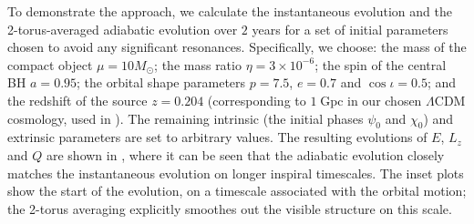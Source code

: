 
To demonstrate the approach, we calculate the instantaneous evolution and the 2-torus-averaged adiabatic evolution over $2$ years for a set of initial parameters chosen to avoid any significant resonances. Specifically, we choose: the mass of the compact object $\mu = 10 M_{\odot}$; the mass ratio $\eta = 3\times 10^{-6}$; the spin of the central BH $a=0.95$; the orbital shape parameters $p=7.5$, $e=0.7$ and $\cos \iota = 0.5$; and the redshift of the source $z=0.204$ (corresponding to $1\;\mathrm{Gpc}$ in our chosen $\Lambda$CDM cosmology, used in ). The remaining intrinsic (the initial phases $\psi_0$ and $\chi_0$) and extrinsic parameters are set to arbitrary values. The resulting evolutions of $E$, $L_z$ and $Q$ are shown in , where it can be seen that the adiabatic evolution closely matches the instantaneous evolution on longer inspiral timescales. The inset plots show the start of the evolution, on a timescale associated with the orbital motion; the 2-torus averaging explicitly smoothes out the visible structure on this scale.

